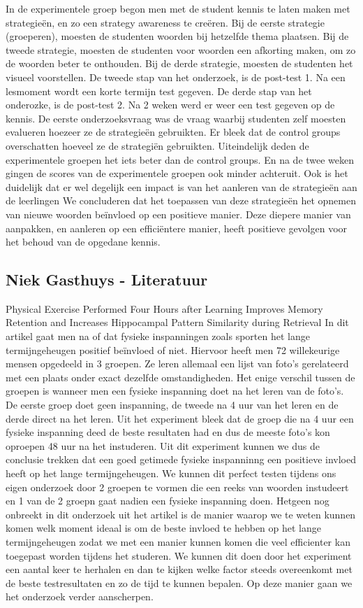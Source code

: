 \documentclass{hogent-article}
\begin{document}
	In de experimentele groep begon men met de student kennis te laten maken met strategieën, en zo een strategy awareness te creëren. Bij de eerste strategie (groeperen), moesten de studenten woorden bij hetzelfde thema plaatsen. Bij de tweede strategie, moesten de studenten voor woorden een afkorting maken, om zo de woorden beter te onthouden. Bij de derde strategie, moesten de studenten het visueel voorstellen.
	De tweede stap van het onderzoek, is de post-test 1. Na een lesmoment wordt een korte termijn test gegeven.
	De derde stap van het onderozke, is de post-test 2. Na 2 weken werd er weer een test gegeven op de kennis.
	De eerste onderzoeksvraag was de vraag waarbij studenten zelf moesten evalueren hoezeer ze de strategieën gebruikten. Er bleek dat de control groups overschatten hoeveel ze de strategiën gebruikten. Uiteindelijk deden de experimentele groepen het iets beter dan de control groups. En na de twee weken gingen de scores van de experimentele groepen ook minder achteruit.
	Ook is het duidelijk dat er wel degelijk een impact is van het aanleren van de strategieën aan de leerlingen
	We concluderen dat het toepassen van deze strategieën het opnemen van nieuwe woorden beïnvloed op een positieve manier. Deze diepere manier van aanpakken, en aanleren op een efficiëntere manier, heeft positieve gevolgen voor het behoud van de opgedane kennis.
	
	\subsection{Niek Gasthuys - Literatuur}
	
	Physical Exercise Performed Four Hours after Learning Improves Memory Retention and Increases Hippocampal Pattern Similarity during Retrieval \autocite{Drongen2016}
	In dit artikel gaat men na of dat fysieke inspanningen zoals sporten het lange termijngeheugen positief beïnvloed of niet. Hiervoor heeft men 72 willekeurige mensen opgedeeld in 3 groepen. Ze leren allemaal een lijst van foto’s gerelateerd met een plaats onder exact dezelfde omstandigheden. Het enige verschil tussen de groepen is wanneer men een fysieke inspanning doet na het leren van de foto’s. De eerste groep doet geen inspanning, de tweede na 4 uur van het leren en de derde direct na het leren. Uit het experiment bleek dat de groep die na 4 uur een fysieke inspanning deed de beste resultaten had en dus de meeste foto’s kon oproepen 48 uur na het instuderen. Uit dit experiment kunnen we dus de conclusie trekken dat een goed getimede fysieke inspanninng een positieve invloed heeft op het lange termijngeheugen. We kunnen dit perfect testen tijdens ons eigen onderzoek door 2 groepen te vormen die een reeks van woorden instudeert en 1 van de 2 groepn gaat nadien een fysieke inspanning doen. Hetgeen nog onbreekt in dit onderzoek uit het artikel is de manier waarop we te weten kunnen komen welk moment ideaal is om de beste invloed te hebben op het lange termijngeheugen zodat we met een manier kunnen komen die veel efficienter kan toegepast worden tijdens het studeren. We kunnen dit doen door het experiment een aantal keer te herhalen en dan te kijken welke factor steeds overeenkomt met de beste testresultaten en zo de tijd te kunnen bepalen. Op deze manier gaan we het onderzoek verder aanscherpen.
	
\end{document}
